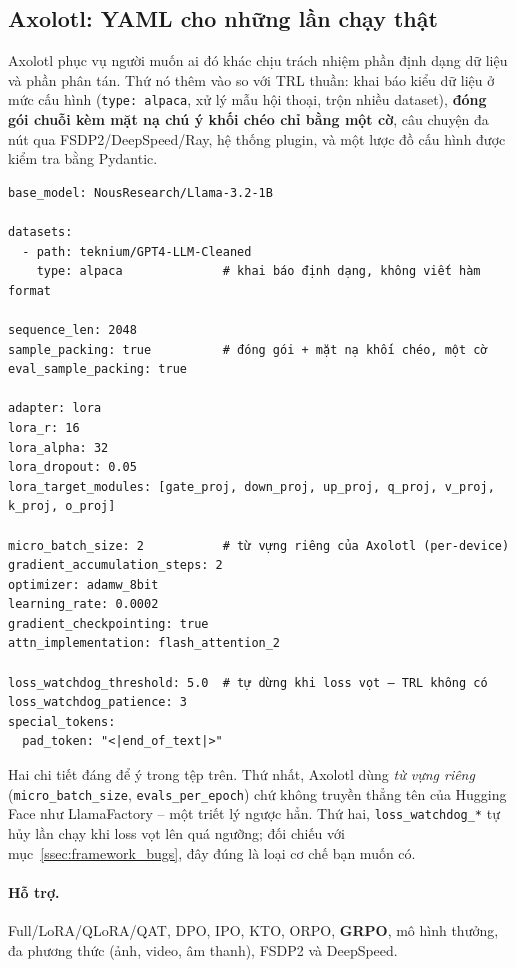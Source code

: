 \subsection{Axolotl: YAML cho những lần chạy thật}
\label{ssec:axolotl}

Axolotl phục vụ người muốn ai đó khác chịu trách nhiệm phần định dạng dữ liệu và phần phân tán. Thứ nó thêm vào so với TRL thuần: khai báo kiểu dữ liệu ở mức cấu hình (\texttt{type: alpaca}, xử lý mẫu hội thoại, trộn nhiều dataset), \textbf{đóng gói chuỗi kèm mặt nạ chú ý khối chéo chỉ bằng một cờ}, câu chuyện đa nút qua FSDP2/DeepSpeed/Ray, hệ thống plugin, và một lược đồ cấu hình được kiểm tra bằng Pydantic.

\begin{verbatim}
base_model: NousResearch/Llama-3.2-1B

datasets:
  - path: teknium/GPT4-LLM-Cleaned
    type: alpaca              # khai báo định dạng, không viết hàm format

sequence_len: 2048
sample_packing: true          # đóng gói + mặt nạ khối chéo, một cờ
eval_sample_packing: true

adapter: lora
lora_r: 16
lora_alpha: 32
lora_dropout: 0.05
lora_target_modules: [gate_proj, down_proj, up_proj, q_proj, v_proj, k_proj, o_proj]

micro_batch_size: 2           # từ vựng riêng của Axolotl (per-device)
gradient_accumulation_steps: 2
optimizer: adamw_8bit
learning_rate: 0.0002
gradient_checkpointing: true
attn_implementation: flash_attention_2

loss_watchdog_threshold: 5.0  # tự dừng khi loss vọt — TRL không có
loss_watchdog_patience: 3
special_tokens:
  pad_token: "<|end_of_text|>"
\end{verbatim}

\noindent Hai chi tiết đáng để ý trong tệp trên. Thứ nhất, Axolotl dùng \emph{từ vựng riêng} (\texttt{micro\_batch\_size}, \texttt{evals\_per\_epoch}) chứ không truyền thẳng tên của Hugging Face như LlamaFactory -- một triết lý ngược hẳn. Thứ hai, \texttt{loss\_watchdog\_*} tự hủy lần chạy khi loss vọt lên quá ngưỡng; đối chiếu với mục~\ref{ssec:framework_bugs}, đây đúng là loại cơ chế bạn muốn có.

\paragraph{Hỗ trợ.} Full/LoRA/QLoRA/QAT, DPO, IPO, KTO, ORPO, \textbf{GRPO}, mô hình thưởng, đa phương thức (ảnh, video, âm thanh), FSDP2 và DeepSpeed.

